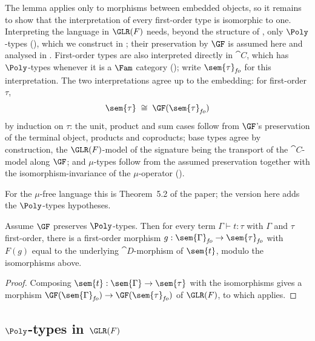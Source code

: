 The lemma applies only to morphisms between embedded objects, so it remains to show that the
interpretation of every first-order type is isomorphic to one. Interpreting the language in $\GLR(F)$ needs, beyond the structure of
, only $\Poly$-types (), which we
construct in ; their preservation by $\GF$ is assumed here and
analysed in . First-order types are also
interpreted directly in $\cat{C}$, which has $\Poly$-types whenever it is a $\Fam$ category
(); write $\sem{\tau}_{\mathit{fo}}$ for this interpretation. The
two interpretations agree up to the embedding: for first-order $\tau$,
\[
  \sem{\tau} \;\cong\; \GF(\sem{\tau}_{\mathit{fo}})
\]
by induction on $\tau$: the unit, product and sum cases follow from $\GF$'s preservation of the
terminal object, products and coproducts; base types agree by construction, the $\GLR(F)$-model of the
signature being the transport of the $\cat{C}$-model along $\GF$; and $\mu$-types follow from
the assumed preservation together with the isomorphism-invariance of the $\mu$-operator
().

For the $\mu$-free language this is Theorem~5.2 of the paper; the version here adds the
$\Poly$-types hypotheses.

\begin{theorem}
\label{thm:conservativity:syntactic-definability}
Assume $\GF$ preserves $\Poly$-types. Then for every term $\Gamma \vdash t : \tau$
with $\Gamma$ and $\tau$ first-order, there is a first-order morphism $g : \sem{\Gamma}_{\mathit{fo}} \to
\sem{\tau}_{\mathit{fo}}$ with $F(g)$ equal to the underlying $\cat{D}$-morphism of $\sem{t}$, modulo the
isomorphisms above.
\end{theorem}

\begin{proof}
Composing $\sem{t} : \sem{\Gamma} \to \sem{\tau}$ with the isomorphisms gives a morphism
$\GF(\sem{\Gamma}_{\mathit{fo}}) \to \GF(\sem{\tau}_{\mathit{fo}})$ of $\GLR(F)$, to which
 applies.
\end{proof}

\subsection{$\Poly$-types in $\GLR(F)$}
\label{sec:conservativity:glr-poly-types}

